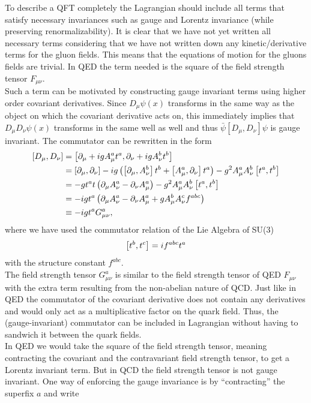 To describe a QFT completely the Lagrangian should include all terms that satisfy necessary invariances such as gauge and Lorentz invariance (while preserving renormalizability). It is clear that we have not yet written all necessary terms considering that we have not written down any kinetic/derivative terms for the gluon fields. This means that the equations of motion for the gluons fields are trivial. In QED the term needed is the square of the field strength tensor $F_{\mu\nu}$.\\
Such a term can be motivated by constructing gauge invariant terms using higher order covariant derivatives. Since $D_\mu\psi(x)$ transforms in the same way as the object on which the covariant derivative acts on, this immediately implies that $D_\mu D_\nu\psi(x)$ transforms in the same well as well and thus $\bar\psi\left[D_\mu, D_\nu\right]\psi$ is gauge invariant. The commutator can be rewritten in the form
\begin{align}
    \left[D_\mu,D_\nu\right]&=\left[\partial_\mu+igA_\mu^at^a, \partial_\nu+igA_\nu^bt^b\right]\\
    &=\left[\partial_\mu, \partial_\nu\right]-ig\left(\left[\partial_\mu, A_\nu^b\right]t^b+\left[A_\mu^a, \partial_\nu\right]t^a\right)-g^2A_\mu^aA_\nu^b\left[t^a, t^b\right]\\
    &=-gt^at\left(\partial_\mu A_\nu^a-\partial_\nu A_\mu^a\right)-g^2A_\mu^aA_\nu^b\left[t^a,t^b\right]\\
    &=-igt^a\left(\partial_\mu A_\nu^a-\partial_\nu A_\mu^a+gA_\mu^b A_\nu^cf^{abc}\right)\\
    &\equiv-igt^aG_{\mu\nu}^a,
\end{align}
where we have used the commutator relation of the Lie Algebra of SU(3)
\begin{equation}
    \left[t^b,t^c\right]=if^{abc}t^a
\end{equation}
with the structure constant $f^{abc}$.\\
The field strength tensor $G_{\mu\nu}^a$ is similar to the field strength tensor of QED $F_{\mu\nu}$ with the extra term resulting from the non-abelian nature of QCD. Just like in QED the commutator of the covariant derivative does not contain any derivatives and would only act as a multiplicative factor on the quark field. Thus, the (gauge-invariant) commutator can be included in Lagrangian without having to sandwich it between the quark fields.\\
In QED we would take the square of the field strength tensor, meaning contracting the covariant and the contravariant field strength tensor, to get a Lorentz invariant term. But in QCD the field strength tensor is not gauge invariant. One way of enforcing the gauge invariance is by “contracting” the superfix $a$ and write
